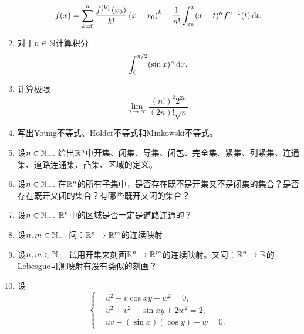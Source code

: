 \begin{enumerate}
\begin{equation*}
        f(x)=\sum_{k=0}^{n}\frac{f^{(k)}\left(x_0\right)}{k!}\left(x-x_0\right)^k+\frac{1}{n!}\int_{x_0}^x (x-t)^n f^{n+1}(t)\mathop{}\!\mathrm{d} t.
    \end{equation*}
    \item 对于$n\in \mathbb{N}$计算积分\begin{equation*}
        \int_0^{\pi/2}(\sin x)^n\mathop{}\!\mathrm{d} x.
    \end{equation*}
    \item 计算极限\begin{equation*}
        \lim_{n\to \infty}\frac{(n!)^2 2^{2n}}{(2n)!\sqrt{n}}.
    \end{equation*}
    \item 写出Young不等式、H\"older不等式和Minkowski不等式。
    \item 设$n\in\mathbb{N_+}$. 给出$\mathbb{R}^n$中开集、闭集、导集、闭包、完全集、紧集、列紧集、连通集、道路连通集、凸集、区域的定义。
    \item 设$n\in\mathbb{N_+}$. 在$\mathbb{R}^n$的所有子集中，是否存在既不是开集又不是闭集的集合？是否存在既开又闭的集合？有哪些既开又闭的集合？
    \item 设$n\in\mathbb{N_+}$. $\mathbb{R}^n$中的区域是否一定是道路连通的？
    \item 设$n,m\in\mathbb{N_+}$. 问：$\mathbb{R}^n\to\mathbb{R}^m$的连续映射\\
    \item 设$n,m\in\mathbb{N_+}$. 试用开集来刻画$\mathbb{R}^n\to\mathbb{R}^m$的连续映射。又问：$\mathbb{R}^n\to\mathbb{R}$的Lebesgue可测映射有没有类似的刻画？
    \item 设\begin{equation*}
        \left\{\begin{aligned}
            &u^2-v\cos xy+w^2=0,\\
            &u^2+v^2-\sin xy+2w^2=2,\\
            &uv-(\sin x)(\cos y)+w=0.
        \end{aligned}\right.

\end{equation*}
\end{enumerate}
